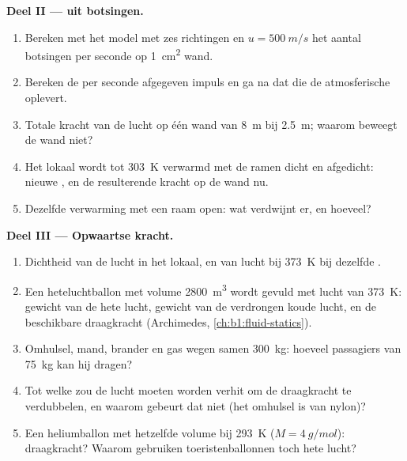 \begin{problem}
\medskip
\noindent\textbf{Deel II ---  uit botsingen.}
\begin{enumerate}[resume]
  \item Bereken met het model met zes richtingen en $u = \qty{500}{m/s}$
        het aantal botsingen per seconde op \qty{1}{cm^2} wand.
  \item Bereken de per seconde afgegeven impuls en ga na dat die
        de atmosferische  oplevert.
  \item Totale kracht van de lucht op één wand van \qty{8}{m} bij \qty{2.5}{m};
        waarom beweegt de wand niet?
  \item Het lokaal wordt tot \qty{303}{K} verwarmd met de ramen dicht en
        afgedicht: nieuwe , en de resulterende kracht op de wand nu.
  \item Dezelfde verwarming met een raam open: wat verdwijnt er, en hoeveel?
\end{enumerate}

\medskip
\noindent\textbf{Deel III --- Opwaartse kracht.}
\begin{enumerate}[resume]
  \item Dichtheid van de lucht in het lokaal, en van lucht bij \qty{373}{K} bij
        dezelfde .
  \item Een heteluchtballon met volume \qty{2800}{m^3} wordt gevuld met lucht van
        \qty{373}{K}: gewicht van de hete lucht, gewicht van de verdrongen koude
        lucht, en de beschikbare draagkracht (Archimedes,
        \cref{ch:b1:fluid-statics}).
  \item Omhulsel, mand, brander en gas wegen samen \qty{300}{kg}: hoeveel
        passagiers van \qty{75}{kg} kan hij dragen?
  \item Tot welke  zou de lucht moeten worden verhit om de draagkracht
        te verdubbelen, en waarom gebeurt dat niet (het omhulsel is van nylon)?
  \item Een heliumballon met hetzelfde volume bij \qty{293}{K}
        ($M = \qty{4}{g/mol}$): draagkracht? Waarom gebruiken toeristenballonnen
        toch hete lucht?
\end{enumerate}


\end{problem}
